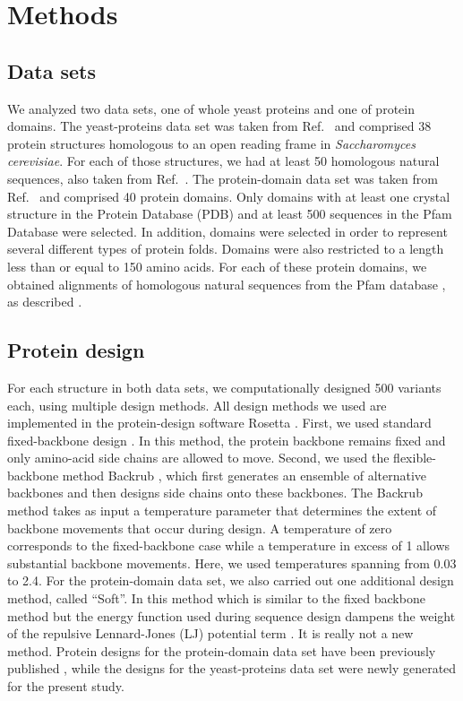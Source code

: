 \documentclass[12pt]{article}
\begin{document}
\section{Methods}
\label{Methods}

\subsection{Data sets}

We analyzed two data sets, one of whole yeast proteins and one of protein domains. The yeast-proteins data set was taken from Ref.\ \cite{Ramsey2011} and comprised 38 protein structures homologous to an open reading frame in \emph{Saccharomyces cerevisiae}. For each of those structures, we had at least 50 homologous natural sequences, also taken from Ref.\ \cite{Ramsey2011}. The protein-domain data set was taken from Ref.\ \cite{OllikainenKortemme} and comprised 40 protein domains. Only domains with at least one crystal structure in the Protein Database (PDB) and at least 500 sequences in the Pfam Database were selected. In addition, domains were selected in order to represent several different types of protein folds. Domains were also restricted to a length less than or equal to 150 amino acids. For each of these protein domains, we obtained alignments of homologous natural sequences from the Pfam database \cite{Pfam}, as described \cite{OllikainenKortemme}.  

\subsection{Protein design}

For each structure in both data sets, we computationally designed 500 variants each, using multiple design methods. All design methods we used are implemented in the protein-design software Rosetta \cite{generic-rosetta-reference}. First, we used standard fixed-backbone design \cite{fixed-design}. In this method, the protein backbone remains fixed and only amino-acid side chains are allowed to move. Second, we used the flexible-backbone method Backrub \cite{Smith2008}, which first generates an ensemble of alternative backbones and then designs side chains onto these backbones. The Backrub method takes as input a temperature parameter that determines the extent of backbone movements that occur during design. A temperature of zero corresponds to the fixed-backbone case while a temperature in excess of 1 allows substantial backbone movements. Here, we used temperatures spanning from 0.03 to 2.4. For the protein-domain data set, we also carried out one additional design method, called ``Soft''. In this method which is similar to the fixed backbone method but the energy function used during sequence design dampens the weight of the repulsive Lennard-Jones (LJ) potential term \cite{OllikainenKortemme}. It is really not a new method. Protein designs for the protein-domain data set have been previously published \cite{OllikainenKortemme}, while the designs for the yeast-proteins data set were newly generated for the present study.
\end{document}
